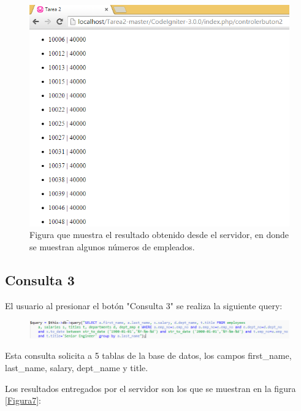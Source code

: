 \begin{figure}[htb]
	\label{Figura5}
	\begin{center}
		\includegraphics[scale=0.7]{imagenes/resultado2.png}
		\caption{Figura que muestra el resultado obtenido desde el servidor, en donde se muestran algunos números de empleados.}
	\end{center}
\end{figure}

\newpage

\subsection{Consulta 3}

El usuario al presionar el botón "Consulta 3" se realiza la siguiente query:

\begin{figure}[htb]
	\label{Figura6}
	\begin{center}
		\includegraphics[scale=0.7]{imagenes/query3.png}
	\end{center}
\end{figure}

Esta consulta solicita a 5 tablas de la base de datos, los campos first\_name, last\_name, salary, dept\_name y title.

Los resultados entregados por el servidor son los que se muestran en la figura \ref{Figura7}:

